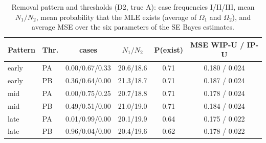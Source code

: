 \documentclass[a4paper,11pt]{article}
\begin{document}
\begin{table}[htbp]
\centering\small\setlength{\tabcolsep}{3pt}
\caption{Removal pattern and thresholds (D2, true A): case frequencies I/II/III, mean $N_1/N_2$, mean probability that the MLE exists (average of $\Omega_1$ and $\Omega_2$), and average MSE over the six parameters of the SE Bayes estimates.}\label{tab:pattern}
\begin{tabular}{llcccc}
\hline
Pattern & Thr. & cases & $N_1/N_2$ & P(exist) & MSE WIP-U / IP-U\\\hline
early & PA & 0.00/0.67/0.33 & 20.6/18.6 & 0.71 & 0.180 / 0.024\\
early & PB & 0.36/0.64/0.00 & 21.3/18.7 & 0.71 & 0.187 / 0.024\\
mid & PA & 0.00/0.75/0.25 & 20.7/18.8 & 0.71 & 0.178 / 0.024\\
mid & PB & 0.49/0.51/0.00 & 21.0/19.0 & 0.71 & 0.184 / 0.024\\
late & PA & 0.01/0.99/0.00 & 20.1/19.9 & 0.64 & 0.175 / 0.022\\
late & PB & 0.96/0.04/0.00 & 20.4/19.6 & 0.62 & 0.178 / 0.022\\\hline
\end{tabular}
\end{table}
\end{document}

